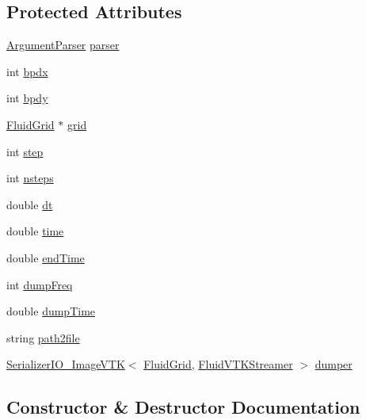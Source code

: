 \subsection*{Protected Attributes}
\begin{DoxyCompactItemize}
\item 
\hyperlink{class_argument_parser}{Argument\+Parser} \hyperlink{class_simulation___fluid_a0162c8af40a215e4272d9e35e2f3e6ee}{parser}
\item 
int \hyperlink{class_simulation___fluid_afdba1d2d803600ad9054385935eeeb39}{bpdx}
\item 
int \hyperlink{class_simulation___fluid_a30e4b932f8305919ccc1243de639d047}{bpdy}
\item 
\hyperlink{_definitions_8h_aff3288a3741f5098bcc456bb13440189}{Fluid\+Grid} $\ast$ \hyperlink{class_simulation___fluid_a16124c906622008dc3e1a798e5c78a4b}{grid}
\item 
int \hyperlink{class_simulation___fluid_a413104a68456556da195430ec33aa885}{step}
\item 
int \hyperlink{class_simulation___fluid_abe7ce8f7e473422020cd6be97bdf4150}{nsteps}
\item 
double \hyperlink{class_simulation___fluid_ad7aa765d258a0ba11c46893884960173}{dt}
\item 
double \hyperlink{class_simulation___fluid_a743ea183f44eff7da35f693520f84bc8}{time}
\item 
double \hyperlink{class_simulation___fluid_ac906e2f929cbe802d4dc6bcf0dbb989d}{end\+Time}
\item 
int \hyperlink{class_simulation___fluid_ae8bb71bdc00d5df69ab62c41993345e9}{dump\+Freq}
\item 
double \hyperlink{class_simulation___fluid_a0d1adc2fc5a0cbc9073f261d9a30072f}{dump\+Time}
\item 
string \hyperlink{class_simulation___fluid_ada262b3831db9133a25f0ba8af00ff7b}{path2file}
\item 
\hyperlink{class_serializer_i_o___image_v_t_k}{Serializer\+I\+O\+\_\+\+Image\+V\+T\+K}$<$ \hyperlink{_definitions_8h_aff3288a3741f5098bcc456bb13440189}{Fluid\+Grid}, \hyperlink{struct_fluid_v_t_k_streamer}{Fluid\+V\+T\+K\+Streamer} $>$ \hyperlink{class_simulation___fluid_a7a23af5af55a67f1d6599c311d071a62}{dumper}
\end{DoxyCompactItemize}


\subsection{Constructor \& Destructor Documentation}
\hypertarget{class_simulation___fluid_ad06473e56135a5423660fe985380086c}{}
